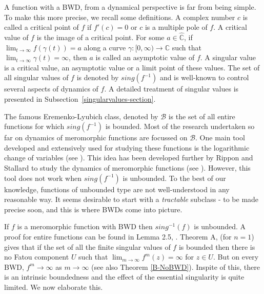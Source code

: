 \documentclass[11pt,a4paper]{article}
\begin{document}
\par A function  with a BWD, from a dynamical perspective  is far from being simple. To make this more precise, we recall  some definitions. A complex number $c$ is called a critical point of $f$ if  $f'(c)=0$ or $c$ is a multiple pole of $f$. A critical value of $f$ is the image of a critical point. For some $a \in \widehat{\mathbb{C}}$, if  $\lim_{t \to \infty}f(\gamma(t)) =a$  along a curve $\gamma:[0,\infty)\to\mathbb{C}$ such that $\lim_{t \to \infty}\gamma(t) = \infty$, then $a$ is called an asymptotic value of $f$. A singular value is a critical value, an asymptotic value or a limit point of these values. The set of all singular values of $f$ is denoted by $sing(f^{-1})$ and is well-known to control several aspects of dynamics of $f$. A detailed treatment of singular values is presented in Subsection~\ref{singularvalues-section}.
\par  The famous Eremenko-Lyubich class, denoted by $\mathcal{B}$ is the set of all entire functions for which $sing(f^{-1})$ is bounded. Most of the research undertaken so far on dynamics of meromorphic functions are focussed on $\mathcal{B}$. One main tool developed and extensively used for studying these functions is the logarithmic change of variables (see \cite{EremenkoLyubich 1992,Rempe2017, RRRS 2011, Sixsmith2018}). This idea has been developed further  by Rippon and Stallard to study the dynamics of meromorphic functions (see \cite{RipponStallard 1999}). However, this tool does not work when $sing(f^{-1})$ is unbounded. To the best of our knowledge, functions of unbounded type are not well-understood in any reasonable way. It seems desirable to start with a \textit{tractable} subclass - to be made precise soon, and this is where BWDs come into picture.
\par  If $f$ is a meromorphic function with BWD then $sing^{-1}(f)$ is unbounded. A proof for entire functions can be found in Lemma 2.5, \cite{GhoraNayakSahoo 2021}. Theorem A, \cite{RipponStallard 1999} (for $n=1$)  gives that if  the set of all the finite singular values of $f$ is bounded then there is no Fatou component $U$ such that $\lim_{m \to \infty}f^m (z) =\infty$ for $z \in U$. But on every BWD, $f^m \to \infty$ as $m \to \infty$ (see also Theorem \ref{B-NoBWD}). Inspite of this, there is an intrinsic boundedness and the effect of the essential singularity is quite limited. We now elaborate this. 
\end{document}
